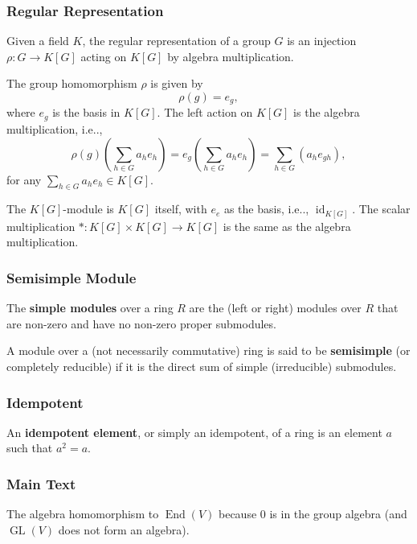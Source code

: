 \documentclass[12pt, letterpaper]{article}
\makeatletter
\newcommand{\GL}{\operatorname{GL}}
\newcommand{\End}{\operatorname{End}}
\newcommand{\idt}{\operatorname{id}}
\newcommand\ie{i.e\@ifnextchar.{}{.\@}}
\theoremstyle{definition}
\theoremstyle{remark}
\theoremstyle{definition}
\theoremstyle{plain}
\numberwithin{equation}{section}
\makeatother
\begin{document}
	\subsubsection{Regular Representation}
	Given a field $K$, the regular representation of a group $G$
	is an injection $\rho \colon G\to K[G]$ acting on $K[G]$ by algebra multiplication.
	
	The group homomorphism $\rho$ is given by
	\[\rho(g)=e_g, \]
	where $e_g$ is the basis in $K[G]$. The left action on $K[G]$ is the algebra multiplication,
	\ie,
	\[\rho(g)\left(\sum_{h\in G}a_he_h\right)=e_g\left(\sum_{h\in G}a_he_h\right)=\sum_{h\in G} \left(a_he_{gh}\right), \]
	for any $\sum_{h\in G}a_he_h\in K[G]$.
	
	The $K[G]$-module is $K[G]$ itself, with $e_e$ as the basis, \ie, $\idt_{K[G]}$.
	The scalar multiplication $*\colon K[G]\times K[G]\to K[G]$ is the same as the algebra multiplication.
	
	\subsubsection{Semisimple Module}
	
	\begin{def*}
		The \textbf{simple modules} over a ring $R$ are the (left or right) modules over $R$ that are non-zero and have no non-zero proper submodules. 
	\end{def*}
	\begin{def*}
		A module over a (not necessarily commutative) ring is said to be \textbf{semisimple} (or completely reducible) if it is the direct sum of simple (irreducible) submodules.
	\end{def*}

	\subsubsection{Idempotent}
	\begin{def*}
		An \textbf{idempotent element}, or simply an idempotent, of a ring is an element $a$ such that $a^2 = a$.
	\end{def*}
	
	\subsubsection{Main Text}
	
	The algebra homomorphism to $\End(V)$ because $0$ is in the group algebra
	(and $\GL(V)$ does not form an algebra).
	
\end{document}

